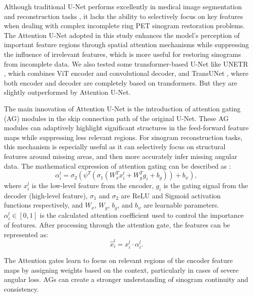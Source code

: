 \documentclass[12pt]{iopart}
\begin{document}
Although traditional U-Net performs excellently in medical image segmentation and reconstruction tasks \cite{ronneberger2015unetconvolutionalnetworksbiomedical}, it lacks the ability to selectively focus on key features when dealing with complex incomplete ring PET sinogram restoration problems. The Attention U-Net \cite{oktay2018attentionunetlearninglook} adopted in this study enhances the model's perception of important feature regions through spatial attention mechanisms while suppressing the influence of irrelevant features, which is more useful for restoring sinograms from incomplete data. We also tested some transformer-based U-Net like UNETR \cite{hatamizadeh2021unetrtransformers3dmedical}, which combines ViT encoder and convolutional decoder, and TransUNet \cite{chen2021transunettransformersmakestrong}, where both encoder and decoder are completely based on transformers. But they are slightly outperformed by Attention U-Net.

The main innovation of Attention U-Net is the introduction of attention gating (AG) modules in the skip connection path of the original U-Net. These AG modules can adaptively highlight significant structures in the feed-forward feature maps while suppressing less relevant regions. 
For sinogram reconstruction tasks, this mechanism is especially useful as it can selectively focus on structural features around missing areas, and then more accurately infer missing angular data. The mathematical expression of attention gating can be described as \cite{oktay2018attentionunetlearninglook}:
\begin{equation}
\alpha_i^l = \sigma_2(\psi^T(\sigma_1(W_x^T x_i^l + W_g^T g_i + b_g)) + b_\psi),
\end{equation}
where $x_i^l$ is the low-level feature from the encoder, $g_i$ is the gating signal from the decoder (high-level feature), $\sigma_1$ and $\sigma_2$ are ReLU and Sigmoid activation functions respectively, and $W_x$, $W_g$, $b_g$, and $b_\psi$ are learnable parameters. $\alpha_i^l \in [0,1]$ is the calculated attention coefficient used to control the importance of features.
After processing through the attention gate, the features can be represented as:
\begin{equation}
\hat{x}_i^l = x_i^l \cdot \alpha_i^l.
\end{equation}

The Attention gates learn to focus on relevant regions of the encoder feature maps by assigning weights based on the context, particularly in cases of severe angular loss. AGs can create a stronger understanding of sinogram continuity and consistency.
\end{document}
